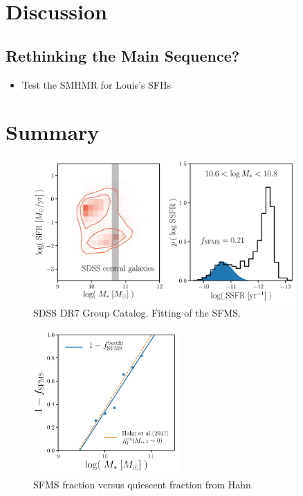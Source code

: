 \documentclass[12pt, letterpaper, preprint]{aastex}
\newcommand{\bitem}{\begin{itemize}}
\newcommand{\eitem}{\end{itemize}}
\begin{document}
\section{Discussion} \label{sec:discussion}
\subsection{Rethinking the Main Sequence?}
\bitem 
\item Test the SMHMR for Louis's SFHs 
\eitem 

\section{Summary} \label{sec:summary}

\begin{figure}
\begin{center}
\includegraphics[width=0.9\textwidth]{figs/groupcat.pdf}
\caption{SDSS DR7 Group Catalog. Fitting of the SFMS.}
\label{fig:groupcat}
\end{center}
\end{figure}

\begin{figure}
\begin{center}
\includegraphics[width=0.5\textwidth]{figs/fq_fsfms.pdf}
\caption{SFMS fraction versus quiescent fraction from Hahn}
\label{fig:fq_fsfms}
\end{center}
\end{figure}
\end{document}
